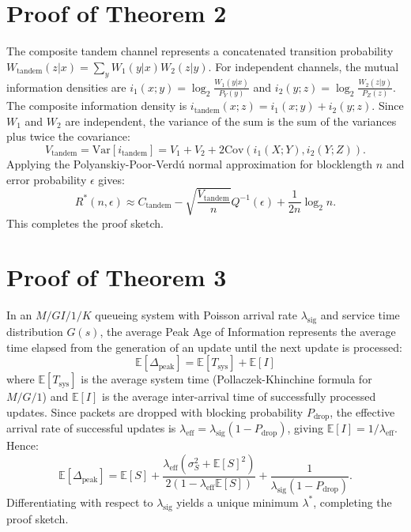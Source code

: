 \documentclass[journal]{IEEEtran}
\begin{document}
\section{Proof of Theorem 2}
The composite tandem channel represents a concatenated transition probability $W_{\text{tandem}}(z|x) = \sum_y W_1(y|x) W_2(z|y)$. For independent channels, the mutual information densities are $i_1(x;y) = \log_2 \frac{W_1(y|x)}{P_Y(y)}$ and $i_2(y;z) = \log_2 \frac{W_2(z|y)}{P_Z(z)}$. The composite information density is $i_{\text{tandem}}(x;z) = i_1(x;y) + i_2(y;z)$. Since $W_1$ and $W_2$ are independent, the variance of the sum is the sum of the variances plus twice the covariance:
\begin{equation}
V_{\text{tandem}} = \text{Var}[i_{\text{tandem}}] = V_1 + V_2 + 2\text{Cov}(i_1(X;Y), i_2(Y;Z)).
\end{equation}
Applying the Polyanskiy-Poor-Verdú normal approximation for blocklength $n$ and error probability $\epsilon$ gives:
\begin{equation}
R^*(n, \epsilon) \approx C_{\text{tandem}} - \sqrt{\frac{V_{\text{tandem}}}{n}} Q^{-1}(\epsilon) + \frac{1}{2n} \log_2 n.
\end{equation}
This completes the proof sketch.

\section{Proof of Theorem 3}
In an $M/GI/1/K$ queueing system with Poisson arrival rate $\lambda_{\text{sig}}$ and service time distribution $G(s)$, the average Peak Age of Information represents the average time elapsed from the generation of an update until the next update is processed:
\begin{equation}
\mathbb{E}[\Delta_{\text{peak}}] = \mathbb{E}[T_{\text{sys}}] + \mathbb{E}[I]
\end{equation}
where $\mathbb{E}[T_{\text{sys}}]$ is the average system time (Pollaczek-Khinchine formula for $M/G/1$) and $\mathbb{E}[I]$ is the average inter-arrival time of successfully processed updates. Since packets are dropped with blocking probability $P_{\text{drop}}$, the effective arrival rate of successful updates is $\lambda_{\text{eff}} = \lambda_{\text{sig}}(1 - P_{\text{drop}})$, giving $\mathbb{E}[I] = 1/\lambda_{\text{eff}}$. Hence:
\begin{equation}
\mathbb{E}[\Delta_{\text{peak}}] = \mathbb{E}[S] + \frac{\lambda_{\text{eff}}(\sigma_S^2 + \mathbb{E}[S]^2)}{2(1 - \lambda_{\text{eff}}\mathbb{E}[S])} + \frac{1}{\lambda_{\text{sig}}(1 - P_{\text{drop}})}.
\end{equation}
Differentiating with respect to $\lambda_{\text{sig}}$ yields a unique minimum $\lambda^*$, completing the proof sketch.
\end{document}
